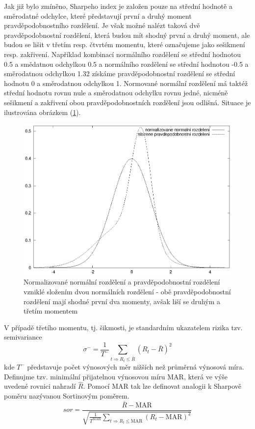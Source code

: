 \documentclass[a4paper]{book}
\begin{document}
Jak již bylo zmíněno, Sharpeho index je založen pouze na střední hodnotě a směrodatné odchylce, které představují první a druhý moment pravděpodobnostního rozdělení. Je však možné nalézt taková dvě pravděpodobnostní rozdělení, která budou mít shodný první a druhý moment, ale budou se lišit v třetím resp. čtvrtém momentu, které označujeme jako sešikmení resp. zakřivení. Například kombinací normálního rozdělení se střední hodnotou 0.5 a smědatnou odchylkou 0.5 a normálního rozdělení se střední hodnotou -0.5 a směrodatnou odchylkou 1.32 získáme pravděpodobnostní rozdělení se střední hodnotu 0 a směrodatnou odchylkou 1. Normované normální rozdělení má taktéž střední hodnotu rovnu nule a směrodatnou odchylku rovnu jedné, nicméně sešikmení a zakřivení obou pravděpodobnostních rozdělení jsou odlišná. Situace je ilustrována obrázkem (\ref{probability_distribution}).
\begin{figure}
  \centering
  \includegraphics[scale=0.75]{probability_distribution.eps}
  \caption{Normalizované normální rozdělení a pravděpodobnostní rozdělení vzniklé složením dvou normálních rozdělení - obě pravděpodobnostní rozdělení mají shodné první dva momenty, avšak liší se druhým a třetím momentem}
  \label{probability_distribution}
\end{figure}

V případě třetího momentu, tj. šikmosti, je standardním ukazatelem rizika tzv. semivariance
\begin{equation*}
\sigma^{-} = \frac{1}{T^{-}} \sum_{t \Rightarrow R_t \le \bar{R}} (R_t - \bar{R})^2
\end{equation*}
kde $T^{-}$ představuje počet výnosových měr nižších než průměrná výnosová míra. Definujme tzv. minimální přijatelnou výnosovou míru MAR, která ve výše uvedené rovnici nahradí $\hat{R}$. Pomocí MAR tak lze definovat analogii k Sharpově poměru nazývanou Sortinovým poměrem.
\begin{equation*}
sor = \frac{\bar{R} - \mathrm{MAR}}{\sqrt{\frac{1}{T^{\mathrm{MAR}}}\sum_{t \Rightarrow R_t \le \mathrm{MAR}}(R_t - \mathrm{MAR})^2}}
\end{equation*}
\end{document}
